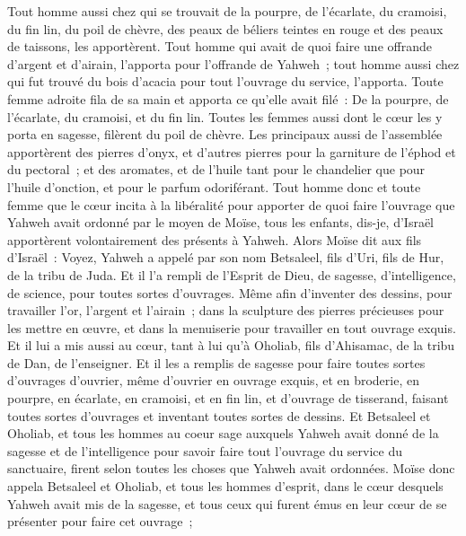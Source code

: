 \begin{multicols}{2}
Tout homme aussi chez qui se trouvait de la pourpre, de l'écarlate, du cramoisi, du fin lin, du poil de chèvre, des peaux de béliers teintes en rouge et des peaux de taissons, les apportèrent.
Tout homme qui avait de quoi faire une offrande d'argent et d'airain, l'apporta pour l'offrande de Yahweh~; tout homme aussi chez qui fut trouvé du bois d'acacia pour tout l'ouvrage du service, l'apporta.
Toute femme adroite fila de sa main et apporta ce qu'elle avait filé~: De la pourpre, de l'écarlate, du cramoisi, et du fin lin.
Toutes les femmes aussi dont le cœur les y porta en sagesse, filèrent du poil de chèvre.
Les principaux aussi de l'assemblée apportèrent des pierres d'onyx, et d'autres pierres pour la garniture de l'éphod et du pectoral~;
et des aromates, et de l'huile tant pour le chandelier que pour l'huile d'onction, et pour le parfum odoriférant.
Tout homme donc et toute femme que le cœur incita à la libéralité pour apporter de quoi faire l'ouvrage que Yahweh avait ordonné par le moyen de Moïse, tous les enfants, dis-je, d'Israël apportèrent volontairement des présents à Yahweh.
Alors Moïse dit aux fils d'Israël~: Voyez, Yahweh a appelé par son nom Betsaleel, fils d'Uri, fils de Hur, de la tribu de Juda.
Et il l'a rempli de l'Esprit de Dieu, de sagesse, d'intelligence, de science, pour toutes sortes d'ouvrages.
Même afin d'inventer des dessins, pour travailler l'or, l'argent et l'airain~;
dans la sculpture des pierres précieuses pour les mettre en œuvre, et dans la menuiserie pour travailler en tout ouvrage exquis.
Et il lui a mis aussi au cœur, tant à lui qu'à Oholiab, fils d'Ahisamac, de la tribu de Dan, de l'enseigner.
Et il les a remplis de sagesse pour faire toutes sortes d'ouvrages d'ouvrier, même d'ouvrier en ouvrage exquis, et en broderie, en pourpre, en écarlate, en cramoisi, et en fin lin, et d'ouvrage de tisserand, faisant toutes sortes d'ouvrages et inventant toutes sortes de dessins.
\VerseOne{}Et Betsaleel et Oholiab, et tous les hommes au coeur sage auxquels Yahweh avait donné de la sagesse et de l'intelligence pour savoir faire tout l'ouvrage du service du sanctuaire, firent selon toutes les choses que Yahweh avait ordonnées.
Moïse donc appela Betsaleel et Oholiab, et tous les hommes d'esprit, dans le cœur desquels Yahweh avait mis de la sagesse, et tous ceux qui furent émus en leur cœur de se présenter pour faire cet ouvrage~;

\end{multicols}
